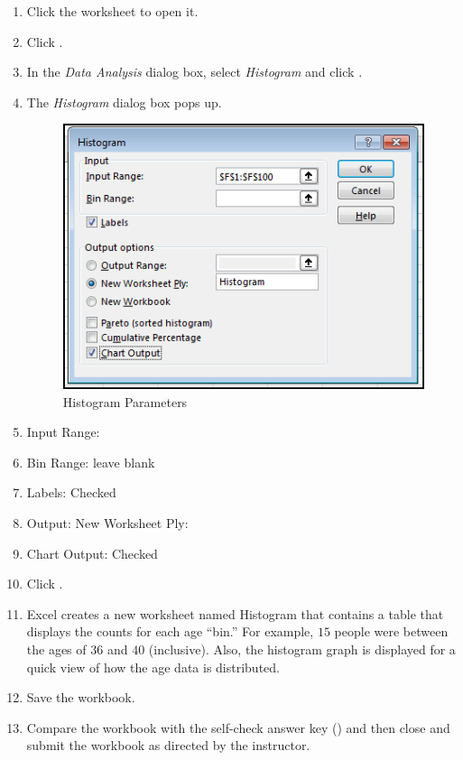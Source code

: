 \begin{enumbox}
	\begin{enumerate}
		\item Click the  worksheet to open it.
		\item Click .
		\item In the \textit{Data Analysis} dialog box, select \textit{Histogram} and click .
		\item The \textit{Histogram} dialog box pops up.

		\begin{figure}[H]
			\centering
			\includegraphics[width=\maxwidth{.75\linewidth}]{gfx/ch09_fig62}
			\caption{Histogram Parameters}
			\label{09:fig62}
		\end{figure}

		\item Input Range: 
		\item Bin Range: leave blank
		\item Labels: Checked
		\item Output: New Worksheet Ply: 
		\item Chart Output: Checked
		\item Click .
		\item Excel creates a new worksheet named Histogram that contains a table that displays the counts for each age ``bin.'' For example, $ 15 $ people were between the ages of $ 36 $ and $ 40 $ (inclusive). Also, the histogram graph is displayed for a quick view of how the age data is distributed.
		\item Save the  workbook.
		
		\item Compare the workbook with the self-check answer key () and then close and submit the  workbook as directed by the instructor.
	
	\end{enumerate}
\end{enumbox}
	
